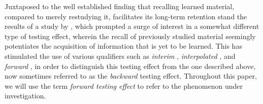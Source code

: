 \documentclass[../main.tex]{subfiles}
\begin{document}
Juxtaposed to the well established finding that recalling learned material, compared to merely restudying it, facilitates its long-term retention \citep{roedigeriiiPowerTestingMemory2006, roedigeriiiTestEnhancedLearningTaking2006, rowlandEffectTestingRestudy2014, adesopeRethinkingUseTests2017} stand the results of a study by \cite{szpunarTestingStudyInsulates2008}, which prompted a surge of interest in a somewhat different type of testing effect, wherein the recall of previously studied material seemingly potentiates the acquisition of information that is yet to be learned. This has stimulated the use of various qualifiers such as \textit{interim} \citep{wissmanInterimTestEffect2011}, \textit{interpolated} \citep{szpunarInterpolatedMemoryTests2013}, and \textit{forward} \citep{pastotterRetrievalPracticeEnhances2014,yangEnhancingLearningRetrieval2018}, in order to distinguish this testing effect from the one described above, now sometimes referred to as the \textit{backward} testing effect. Throughout this paper, we will use the term \textit{forward testing effect} to refer to the phenomenon under investigation.

{
    \biblio
}
\end{document}
